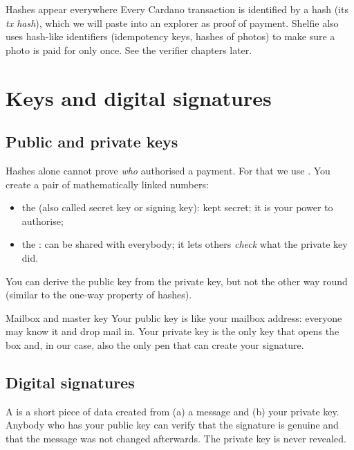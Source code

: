 \begin{shelfiebox}{Hashes appear everywhere}
Every Cardano transaction is identified by a hash (its \emph{tx hash}), which we will paste into an explorer as proof of payment. Shelfie also uses hash-like identifiers (idempotency keys, hashes of photos) to make sure a photo is paid for only once. See the verifier chapters later.
\end{shelfiebox}

\section{Keys and digital signatures}

\subsection{Public and private keys}
Hashes alone cannot prove \emph{who} authorised a payment. For that we use . You create a pair of mathematically linked numbers:

\begin{itemize}
  \item the  (also called secret key or signing key): kept secret; it is your power to authorise;
  \item the : can be shared with everybody; it lets others \emph{check} what the private key did.
\end{itemize}

You can derive the public key from the private key, but not the other way round (similar to the one-way property of hashes).

\begin{analogybox}{Mailbox and master key}
Your public key is like your mailbox address: everyone may know it and drop mail in. Your private key is the only key that opens the box and, in our case, also the only pen that can create your signature.
\end{analogybox}

\subsection{Digital signatures}
A  is a short piece of data created from (a) a message and (b) your private key. Anybody who has your public key can verify that the signature is genuine and that the message was not changed afterwards. The private key is never revealed.

